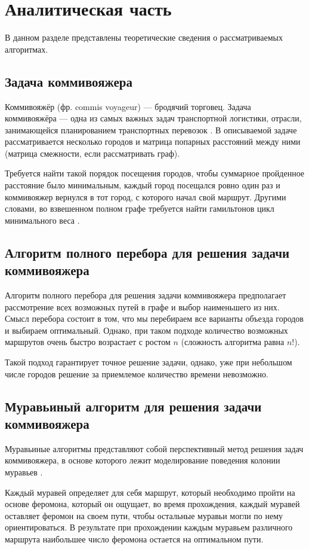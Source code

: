 \chapter{Аналитическая часть}
В данном разделе представлены теоретические сведения о рассматриваемых алгоритмах.

\section{Задача коммивояжера}
Коммивояжёр (фр. commis voyageur) — бродячий торговец. Задача коммивояжёра — одна из самых важных задач транспортной логистики, отрасли, занимающейся планированием транспортных перевозок \cite{kommivoyazh}. В описываемой задаче рассматривается несколько городов и матрица попарных расстояний между ними (матрица смежности, если рассматривать граф). 

Требуется найти такой порядок посещения городов, чтобы суммарное пройденное расстояние было минимальным, каждый город посещался ровно один раз и коммивояжер вернулся в тот город, с которого начал свой маршрут. Другими словами, во взвешенном полном графе требуется найти гамильтонов цикл минимального веса \cite{gamilt}.


\section{Алгоритм полного перебора для решения задачи коммивояжера}
Алгоритм полного перебора для решения задачи коммивояжера предполагает рассмотрение всех возможных путей в графе и выбор наименьшего из них. Смысл перебора состоит в том, что мы перебираем все варианты объезда городов и выбираем оптимальный. Однако, при таком подходе количество возможных маршрутов очень быстро возрастает с ростом $n$ (сложность алгоритма равна $n!$).

Такой подход гарантирует точное решение задачи, однако, уже при небольшом числе городов решение за приемлемое количество времени невозможно.



\section{Муравьиный алгоритм для решения задачи коммивояжера}
Муравьиные алгоритмы представляют собой перспективный метод решения задач коммивояжера, в основе которого лежит моделирование поведения колонии муравьев \cite{Ulianov}.

Каждый муравей определяет для себя маршрут, который необходимо пройти на основе феромона, который он ощущает, во время прохождения, каждый муравей оставляет феромон на своем пути, чтобы остальные муравьи могли по нему ориентироваться. В результате при прохождении каждым муравьем различного маршрута наибольшее число феромона остается на оптимальном пути. 

